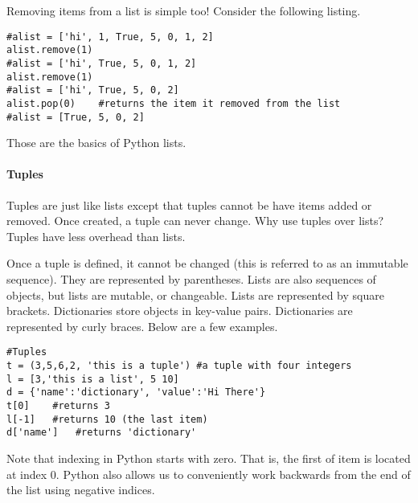 Removing items from a list is simple too!  Consider the following listing.
\begin{lstlisting}[style=python]
#alist = ['hi', 1, True, 5, 0, 1, 2]
alist.remove(1)
#alist = ['hi', True, 5, 0, 1, 2]
alist.remove(1)
#alist = ['hi', True, 5, 0, 2]
alist.pop(0)    #returns the item it removed from the list
#alist = [True, 5, 0, 2]
\end{lstlisting}
Those are the basics of Python lists.
\paragraph{Tuples}
Tuples are just like lists except that tuples cannot be have items added or removed.  Once created, a tuple can never change.  Why use tuples over lists?  Tuples have less overhead than lists.  


Once a tuple is defined, it cannot be changed (this is referred to as an immutable sequence).  They are represented by parentheses.  Lists are also sequences of objects, but lists are mutable, or changeable.  Lists are represented by square brackets.  Dictionaries store objects in key-value pairs.  Dictionaries are represented by curly braces.  Below are a few examples.
\begin{lstlisting}[style=python]
#Tuples
t = (3,5,6,2, 'this is a tuple') #a tuple with four integers
l = [3,'this is a list', 5 10]
d = {'name':'dictionary', 'value':'Hi There'}
t[0]	#returns 3
l[-1]	#returns 10 (the last item)
d['name'] 	#returns 'dictionary'
\end{lstlisting}
Note that indexing in Python starts with zero.  That is, the first of item is located at index 0.  Python also allows us to conveniently work backwards from the end of the list using negative indices.

%

